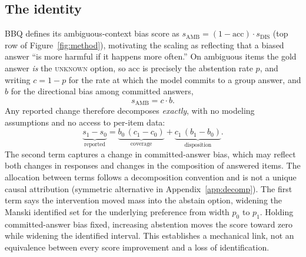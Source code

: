 \subsection{The identity}

BBQ defines its ambiguous-context bias score as
$s_{\text{AMB}} = (1 - \text{acc}) \cdot s_{\text{DIS}}$
\citep{parrish2022bbq} (top row of Figure~\ref{fig:method}), motivating the scaling as reflecting that a biased
answer ``is more harmful if it happens more often.'' On ambiguous items the
gold answer \emph{is} the \textsc{unknown} option, so $\text{acc}$ is
precisely the abstention rate $p$, and writing $c = 1-p$ for the rate at
which the model commits to a group answer, and $b$ for the directional bias
among committed answers,
\[
s_{\text{AMB}} = c \cdot b .
\]
Any reported change therefore decomposes \emph{exactly}, with no modeling
assumptions and no access to per-item data:
\[
\underbrace{s_1 - s_0}_{\text{reported}} =
\underbrace{b_0\,(c_1 - c_0)}_{\text{coverage}} +
\underbrace{c_1\,(b_1 - b_0)}_{\text{disposition}} .
\]
The second term captures a change in committed-answer bias, which may
reflect both changes in responses and changes in the composition of answered
items. The allocation between terms follows a decomposition convention and is not a
unique causal attribution (symmetric alternative in Appendix~\ref{app:decomp}). The first term says the intervention moved
mass into the abstain option, widening the Manski identified set for the
underlying preference from width $p_0$ to $p_1$. Holding committed-answer bias fixed, increasing abstention moves
the score toward zero while widening the identified interval. This
establishes a mechanical link, not an equivalence between every score
improvement and a loss of identification.
